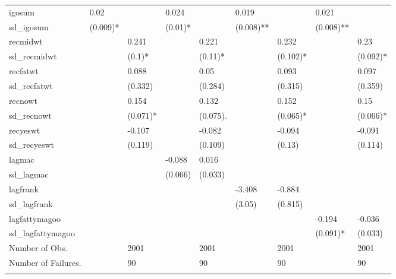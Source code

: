 \begin{table}[ht]
\begin{tabular}{lllllllll}
  igosum & 0.02 &  & 0.024 &  & 0.019 &  & 0.021 &  \\ 
  sd\_igosum & (0.009)* &  & (0.01)* &  & (0.008)** &  & (0.008)** &  \\ 
  recmidwt &  & 0.241 &  & 0.221 &  & 0.232 &  & 0.23 \\ 
  sd\_recmidwt &  & (0.1)* &  & (0.11)* &  & (0.102)* &  & (0.092)* \\ 
  recfatwt &  & 0.088 &  & 0.05 &  & 0.093 &  & 0.097 \\ 
  sd\_recfatwt &  & (0.332)  &  & (0.284)  &  & (0.315)  &  & (0.359)  \\ 
  recnowt &  & 0.154 &  & 0.132 &  & 0.152 &  & 0.15 \\ 
  sd\_recnowt &  & (0.071)* &  & (0.075). &  & (0.065)* &  & (0.066)* \\ 
  recyeswt &  & -0.107 &  & -0.082 &  & -0.094 &  & -0.091 \\ 
  sd\_recyeswt &  & (0.119)  &  & (0.109)  &  & (0.13)  &  & (0.114)  \\ 
  lagmac &  &  & -0.088 & 0.016 &  &  &  &  \\ 
  sd\_lagmac &  &  & (0.066)  & (0.033)  &  &  &  &  \\ 
  lagfrank &  &  &  &  & -3.408 & -0.884 &  &  \\ 
  sd\_lagfrank &  &  &  &  & (3.05)  & (0.815)  &  &  \\ 
  lagfattymagoo &  &  &  &  &  &  & -0.194 & -0.036 \\ 
  sd\_lagfattymagoo &  &  &  &  &  &  & (0.091)* & (0.033)  \\ 
  Number of Obs. &  & 2001 &  & 2001 &  & 2001 &  & 2001 \\ 
  Number of Failures. &  & 90 &  & 90 &  & 90 &  & 90 \\ 
   \hline \footnotesize{  }
\end{tabular}
\end{table}
